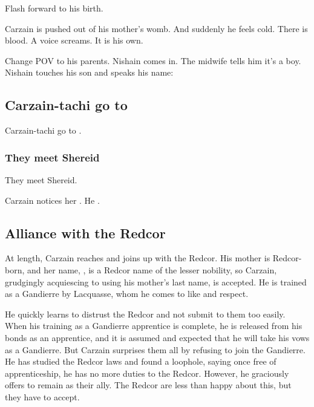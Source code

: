 Flash forward to his birth.

Carzain is pushed out of his mother's womb. 
And suddenly he feels cold. 
There is blood.
A voice screams.
It is his own. 

Change POV to his parents. 
Nishain comes in. 
The midwife tells him it's a boy. 
Nishain touches his son and speaks his name: 









\subsection{Carzain-tachi go to \Redce}
Carzain-tachi go to \Redce. 





\subsubsection{They meet Shereid}
They meet Shereid. 

Carzain notices her . 
He . 









\subsection{Alliance with the Redcor}
At length, Carzain reaches \Redce{} and joins up with the Redcor. His mother is Redcor-born, and her name, \Deracille, is a Redcor name of the lesser nobility, so Carzain, grudgingly acquiescing to using his mother's last name, is accepted. He is trained as a Gandierre by Lacquasse, whom he comes to like and respect. 

He quickly learns to distrust the Redcor and not submit to them too easily. When his training as a Gandierre apprentice is complete, he is released from his bonds as an apprentice, and it is assumed and expected that he will take his vows as a Gandierre. But Carzain surprises them all by refusing to join the Gandierre. He has studied the Redcor laws and found a loophole, saying once free of apprenticeship, he has no more duties to the Redcor. However, he graciously offers to remain as their ally. The Redcor are less than happy about this, but they have to accept. 





